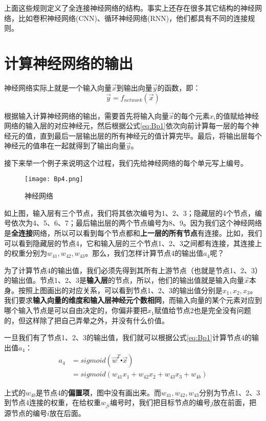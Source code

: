 上面这些规则定义了全连接神经网络的结构。事实上还存在很多其它结构的神经网络，比如卷积神经网络(CNN)、循环神经网络(RNN)，他们都具有不同的连接规则。


\section{计算神经网络的输出}\label{Bp:3}

神经网络实际上就是一个输入向量\(\vec{x}\)到输出向量\(\vec{y}\)的函数，即：
\[
	\vec{y} = f_{network}(\vec{x})
\]

根据输入计算神经网络的输出，需要首先将输入向量\(\vec{x}\)的每个元素{}\(x_i\)的值赋给神经网络的输入层的对应神经元，然后根据公式\ref{eq:Bp1}依次向前计算每一层的每个神经元的值，直到最后一层输出层的所有神经元的值计算完毕。最后，将输出层每个神经元的值串在一起就得到了输出向量\(\vec{y}\)。

接下来举一个例子来说明这个过程，我们先给神经网络的每个单元写上编号。

\begin{figure}[htbp]
	\centering
	\texttt{[image: Bp4.png]}
	\caption{神经网络}
	\label{fig:Bp4}
\end{figure}

如上图，输入层有三个节点，我们将其依次编号为1、2、3；隐藏层的4个节点，编号依次为4、5、6、7；最后输出层的两个节点编号为8、9。因为我们这个神经网络是\textbf{全连接}网络，所以可以看到每个节点都和\textbf{上一层的所有节点}有连接。比如，我们可以看到隐藏层的节点4，它和输入层的三个节点1、2、3之间都有连接，其连接上的权重分别为\(w_{41},w_{42},w_{43}\)。那么，我们怎样计算节点4的输出值\(a_4\)呢？

为了计算节点4的输出值，我们必须先得到其所有上游节点（也就是节点1、2、3）的输出值。节点1、2、3是\textbf{输入层}的节点，所以，他们的输出值就是输入向量\(\vec{x}\)本身。按照上图画出的对应关系，可以看到节点1、2、3的输出值分别是\(x_1,x_2,x_3\)。我们要求\textbf{输入向量的维度和输入层神经元个数相同}，而输入向量的某个元素对应到哪个输入节点是可以自由决定的，你偏非要把\(x_1\)赋值给节点2也是完全没有问题的，但这样除了把自己弄晕之外，并没有什么价值。

一旦我们有了节点1、2、3的输出值，我们就可以根据公式\ref{eq:Bp1}计算节点4的输出值\(a_4\)：
\begin{align*}
	a_4 & =sigmoid(\vec{w}^T\centerdot\vec{x})           \\
	    & =sigmoid(w_{41}x_1+w_{42}x_2+w_{43}x_3+w_{4b})
\end{align*}


上式的\(w_{4b}\)是节点4的\textbf{偏置项}，图中没有画出来。而\(w_{41},w_{42},w_{43}\)分别为节点1、2、3到节点4连接的权重，在给权重\(w_{ji}\)编号时，我们把目标节点的编号\(j\)放在前面，把源节点的编号\(i\)放在后面。

